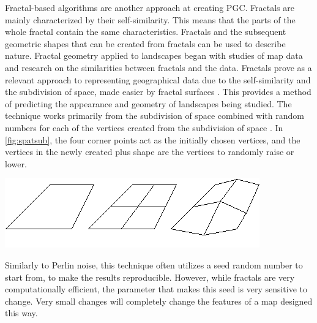 \documentclass[10pt]{report}
\begin{document}
		Fractal-based algorithms are another approach at creating PGC. Fractals are mainly characterized by their self-similarity. This means that the parts of the whole fractal contain the same characteristics. Fractals and the subsequent geometric shapes that can be created from fractals can be used to describe nature. Fractal geometry applied to landscapes began with studies of map data and research on the similarities between fractals and the data. Fractals prove as a relevant approach to representing geographical data due to the self-similarity and the subdivision of space, made easier by fractal surfaces \cite{doi:10.1111/j.1467-8306.1987.tb00158.x}. This provides a method of predicting the appearance and geometry of landscapes being studied. The technique works primarily from the subdivision of space combined with random numbers for each of the vertices created from the subdivision of space \cite{fractal-land}. In \autoref{fig:spatsub}, the four corner points act as the initially chosen vertices, and the vertices in the newly created plus shape are the vertices to randomly raise or lower. 
		
		\begin{minipage}{\textwidth}
			\centering
			\includegraphics[scale=1]{landscapes}
			\label{fig:spatsub}
		\end{minipage}
		
		Similarly to Perlin noise, this technique often utilizes a seed random number to start from, to make the results reproducible. However, while fractals are very computationally efficient, the parameter that makes this seed is very sensitive to change. Very small changes will completely change the features of a map designed this way.
		
\end{document}
